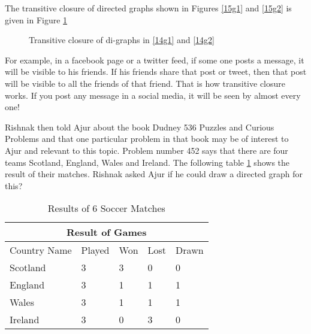 The transitive closure of directed graphs shown in Figures \ref{15g1} and \ref{15g2} is given in Figure \ref{15g4}

\begin{figure}
\begin{center}
\caption{ Transitive closure of di-graphs in \ref{14g1} and \ref{14g2}}\label{15g4}
\end{center}
\end{figure}

For example, in a facebook page or a twitter feed, if some one posts a message, it will be visible to his friends. If his friends share that post or tweet, then that post will be visible to all the friends of that friend. That is how transitive closure works. If you post any message in a social media, it will be seen
by almost every one!


Rishnak then told Ajur about the book Dudney 536 Puzzles and Curious Problems and that one particular problem in that book may be of interest to Ajur and relevant to this topic. Problem number 452 says that there are four teams Scotland, England, Wales and Ireland. The following table \ref {14t1} shows the result of their matches. Rishnak asked Ajur if he could draw a directed graph for this? 
\begin{table}
\begin{center}
\begin{tabular}{ |p{3cm}||p{1.5cm}||p{1.5cm}||p{1.5cm}||p{1.5cm}||  }
 \hline
 \multicolumn{5}{|c|}{Result of Games} \\
 \hline
 Country Name & Played &Won&Lost&Drawn\\
 \hline
 Scotland  & 3    &3&0&0\\
 England& 3& 1 &1&1\\
 Wales&3 &1&1&1\\
 Ireland    &3 &0&3&0\\
 
 \hline
\end{tabular}
\caption{Results of 6 Soccer Matches}\label{14t1}
\end{center}
\end{table}

